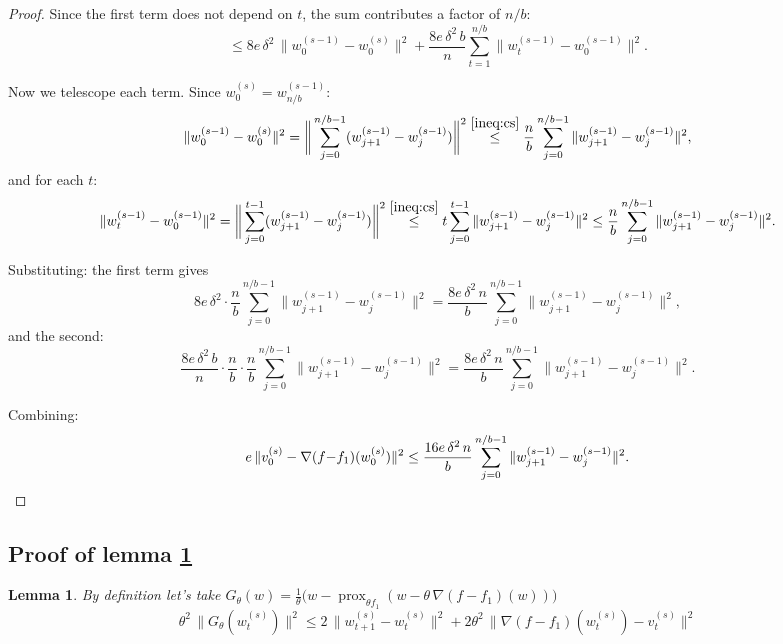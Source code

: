 \documentclass{article}
\DeclareMathOperator{\prox}{prox}
\newtheorem{lemma}{Lemma}
\begin{document}
\begin{proof}
Since the first term does not depend on $t$, 
the sum contributes a factor of $n/b$:
\[
\leq 8e\,\delta^2\,
\|w_0^{(s-1)} - w_0^{(s)}\|^2 
+ \frac{8e\,\delta^2\,b}{n}\sum_{t=1}^{n/b}
\|w_t^{(s-1)} - w_0^{(s-1)}\|^2.
\]

Now we telescope each term. Since 
$w_0^{(s)} = w_{n/b}^{(s-1)}$:
\[
\|w_0^{(s-1)} - w_0^{(s)}\|^2 
= \bigg\|\sum_{j=0}^{n/b-1}
(w_{j+1}^{(s-1)} - w_j^{(s-1)})\bigg\|^2 
\overset{\ref{ineq:cs}}{\leq} 
\frac{n}{b}\sum_{j=0}^{n/b-1}
\|w_{j+1}^{(s-1)} - w_j^{(s-1)}\|^2,
\]
and for each $t$:
\[
\|w_t^{(s-1)} - w_0^{(s-1)}\|^2 
= \bigg\|\sum_{j=0}^{t-1}
(w_{j+1}^{(s-1)} - w_j^{(s-1)})\bigg\|^2 
\overset{\ref{ineq:cs}}{\leq} 
t\sum_{j=0}^{t-1}
\|w_{j+1}^{(s-1)} - w_j^{(s-1)}\|^2 
\leq \frac{n}{b}\sum_{j=0}^{n/b-1}
\|w_{j+1}^{(s-1)} - w_j^{(s-1)}\|^2.
\]

Substituting: the first term gives
\[
8e\,\delta^2 \cdot \frac{n}{b}
\sum_{j=0}^{n/b-1}
\|w_{j+1}^{(s-1)} - w_j^{(s-1)}\|^2 
= \frac{8e\,\delta^2\,n}{b}
\sum_{j=0}^{n/b-1}
\|w_{j+1}^{(s-1)} - w_j^{(s-1)}\|^2,
\]
and the second:
\[
\frac{8e\,\delta^2\,b}{n} \cdot 
\frac{n}{b} \cdot \frac{n}{b}
\sum_{j=0}^{n/b-1}
\|w_{j+1}^{(s-1)} - w_j^{(s-1)}\|^2 
= \frac{8e\,\delta^2\,n}{b}
\sum_{j=0}^{n/b-1}
\|w_{j+1}^{(s-1)} - w_j^{(s-1)}\|^2.
\]

Combining:
\[
e\,\|v_0^{(s)} - \nabla(f{-}f_1)(w_0^{(s)})\|^2 
\leq \frac{16e\,\delta^2\,n}{b}
\sum_{j=0}^{n/b-1}
\|w_{j+1}^{(s-1)} - w_j^{(s-1)}\|^2.
\qedhere
\]
\end{proof}
\subsection{Proof of lemma \ref{lem:gradient_mapping}}

\begin{lemma}
\label{lem:gradient_mapping}
    By definition let's take
    $
    G_\theta(w) = \frac{1}{\theta}\Big(w - \prox_{\theta f_1} \left(w - \theta \, \nabla(f - f_1)(w) \right)\Big)
    $
    \[ 
    \theta^2\,\|G_\theta(w_t^{(s)})\|^2 
  \leq 2\,\|w_{t+1}^{(s)} - w_t^{(s)}\|^2 
  + 2\theta^2\,\|\nabla(f - f_1)(w_t^{(s)}) - v_t^{(s)}\|^2
    \]
\end{lemma}
\end{document}
